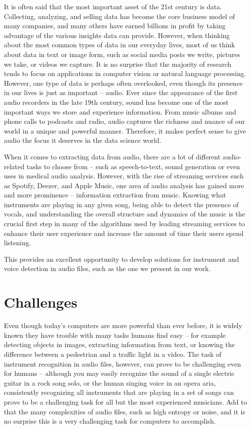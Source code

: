 
It is often said that the most important asset of the 21st century is data. Collecting, analyzing, and selling data has become the core business model of many companies, and many others have earned billions in profit by taking advantage of the various insights data can provide. However, when thinking about the most common types of data in our everyday lives, most of us think about data in text or image form, such as social media posts we write, pictures we take, or videos we capture. It is no surprise that the majority of research tends to focus on applications in computer vision or natural language processing. However, one type of data is perhaps often overlooked, even though its presence in our lives is just as important -- audio. Ever since the appearance of the first audio recorders in the late 19th century, sound has become one of the most important ways we store and experience information. From music albums and phone calls to podcasts and radio, audio captures the richness and nuance of our world in a unique and powerful manner. Therefore, it makes perfect sense to give audio the focus it deserves in the data science world.

When it comes to extracting data from audio, there are a lot of different audio-related tasks to choose from -- such as speech-to-text, sound generation or even uses in medical audio analysis. However, with the rise of streaming services such as Spotify, Deezer, and Apple Music, one area of audio analysis has gained more and more prominence -- information extraction from music. Knowing what instruments are playing in any given song, being able to detect the presence of vocals, and understanding the overall structure and dynamics of the music is the crucial first step in many of the algorithms used by leading streaming services to enhance their user experience and increase the amount of time their users spend listening.

This provides an excellent opportunity to develop solutions for instrument and voice detection in audio files, such as the one we present in our work.

\section{Challenges}

Even though today's computers are more powerful than ever before, it is widely known they have trouble with many tasks humans find easy -- for example detecting objects in images, extracting information from text, or knowing the difference between a pedestrian and a traffic light in a video. The task of instrument recognition in audio files, however, can prove to be challenging even for humans -- although you may easily recognize the sound of a single electric guitar in a rock song solo, or the human singing voice in an opera aria, consistently recognizing all instruments that are playing in a set of songs can prove to be a challenging task for all but the most experienced musicians. Add to that the many complexities of audio files, such as high entropy or noise, and it is no surprise this is a very challenging task for computers to accomplish.

